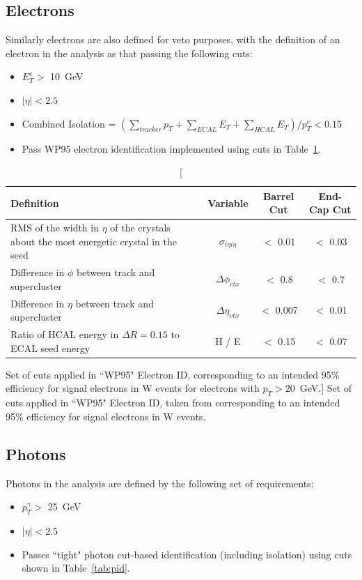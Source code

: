 \subsection{Electrons}
Similarly electrons are also defined for veto purposes, with the definition of an electron in the analysis as that passing the following cuts:

\begin{itemize}
\item $E^{e}_{T} > $ 10~GeV
\item $|\eta| < 2.5$
\item Combined Isolation = $(\sum_{tracker} p_{T} + \sum_{ECAL}E_{T} + \sum_{HCAL}E_{T})/p^{e}_{T} < 0.15$
\item Pass WP95 electron identification implemented using cuts in Table~\ref{tab:eid}.
\end{itemize}

\begin{table}[htbp]
\centering
\begin{tabular}{ m{6.9cm} c c c}
\hline
\hline
 \centering Definition & Variable & Barrel Cut & End-Cap Cut \\
\hline
\hline
RMS of the width in $\eta$ of the crystals about the most energetic crystal in the seed& $\sigma_{i \eta i \eta}$ & $<$ 0.01 & $<$ 0.03\\
Difference in $\phi$ between track and supercluster&$\Delta \phi_{vtx}$& $<$ 0.8 & $<$ 0.7 \\
Difference in $\eta$ between track and supercluster& $\Delta \eta_{vtx}$& $<$ 0.007 & $<$ 0.01\\
Ratio of HCAL energy in $\Delta R = 0.15$ to ECAL seed energy & H / E & $<$ 0.15 & $<$ 0.07\\
\hline
\end{tabular}
\caption[Set of cuts applied in ``WP95" Electron ID, corresponding to an intended 95\% efficiency for signal electrons in W events for electrons with $p_{T} > 20$~GeV.]{\label{tab:eid} Set of cuts applied in ``WP95" Electron ID, taken from \cite{AN-10-116} corresponding to an intended 95\% efficiency for signal electrons in W events.}
\end{table}
\subsection{Photons}

Photons in the analysis are defined by the following set of requirements:
\begin{itemize}
\item $p_{T}^{\gamma} > $ 25~GeV
\item $|\eta| < 2.5$
\item Passes ``tight" photon cut-based identification (including isolation) using cuts shown in Table~\ref{tab:pid}.
\end{itemize}


